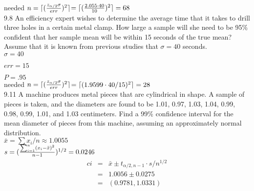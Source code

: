 needed $n = \lceil (\frac{z_{\alpha/2} \sigma}{err})^2 \rceil$$= \lceil(\frac{2.055 \cdot 40}{10})^2\rceil = 68$ \\


9.8 An efficiency expert wishes to determine the average time that it takes to drill three holes in a certain metal clamp. How large a sample will she need to be 95\% confident that her sample mean will be within 15 seconds of the true mean? Assume that it is known from previous studies that $\sigma = 40$ seconds. \\


$\sigma = 40$

$err = 15$

$P = .95$ \\


needed $n = \lceil (\frac{z_{\alpha/2} \sigma}{err})^2 \rceil$$= \lceil(1.9599 \cdot 40/15)^2\rceil = 28$ \\


9.11 A machine produces metal pieces that are cylindrical in shape. A sample of pieces is taken, and the diameters are found to be 1.01, 0.97, 1.03, 1.04, 0.99, 0.98, 0.99, 1.01, and 1.03 centimeters. Find a 99\% confidence interval for the mean diameter of pieces from this machine, assuming an approximately normal distribution. \\

$\bar{x} = \sum x_i /n \approx 1.0055 $ \\


$s = (\frac{\sum_{i=1}^n(x_i - \bar{x})^2}{n-1})^{1/2} = 0.0246$ \\

\begin{eqnarray*}
ci & =& \bar{x} \pm t_{\alpha/2, n-1} \cdot s/n^{1/2}  \\
& = & 1.0056 \pm 0.0275  \\
& = & (0.9781, 1.0331) 
\end{eqnarray*}



